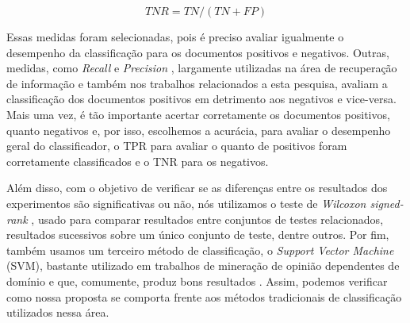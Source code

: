 \documentclass[template.tex]{subfiles}
\begin{document}
\begin{equation}
TNR = TN / (TN + FP)
\label{eq:tnr}
\end{equation}



Essas medidas foram selecionadas, pois é preciso avaliar igualmente o desempenho da classificação para os documentos positivos e negativos. Outras, medidas, como \textit{Recall} e \textit{Precision} \cite{zhu2004recall}, largamente utilizadas na área de recuperação de informação e também nos trabalhos relacionados a esta pesquisa, avaliam a classificação dos documentos positivos em detrimento aos negativos e vice-versa. Mais uma vez, é tão importante acertar corretamente os documentos positivos, quanto negativos e, por isso, escolhemos a acurácia, para avaliar o desempenho geral do classificador, o TPR para avaliar o quanto de positivos foram corretamente classificados e o TNR para os negativos.

Além disso, com o objetivo de verificar se as diferenças entre os resultados dos experimentos são significativas ou não, nós utilizamos o teste de \textit{Wilcoxon signed-rank} \cite{wilcoxon1945individual}, usado para comparar resultados entre conjuntos de testes relacionados, resultados sucessivos sobre um único conjunto de teste, dentre outros. Por fim, também usamos um terceiro método de classificação, o \textit{Support Vector Machine} (SVM), bastante utilizado em trabalhos de mineração de opinião dependentes de domínio e que, comumente, produz bons resultados \cite{ohana2009sentiment, moraes2012document}. Assim, podemos verificar como nossa proposta se comporta frente aos métodos tradicionais de classificação utilizados nessa área. 
\end{document}
